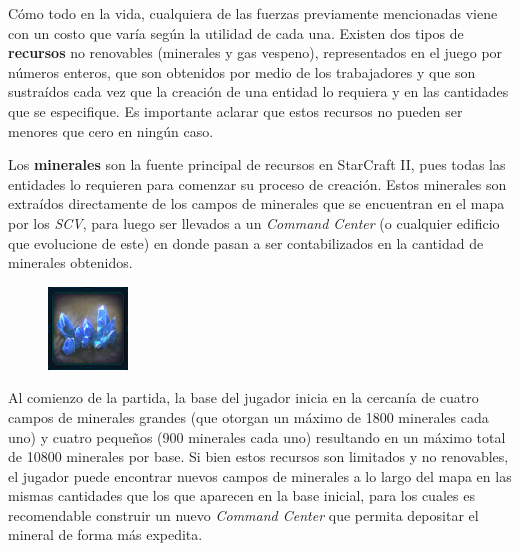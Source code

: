 Cómo todo en la vida, cualquiera de las fuerzas previamente mencionadas viene con un costo que varía según la utilidad de cada una. Existen dos tipos de \textbf{recursos} no renovables (minerales y gas vespeno), representados en el juego por números enteros, que son obtenidos por medio de los trabajadores y que son sustraídos cada vez que la creación de una entidad lo requiera y en las cantidades que se especifique. Es importante aclarar que estos recursos no pueden ser menores que cero en ningún caso.

Los \textbf{minerales} son la fuente principal de recursos en StarCraft II, pues todas las entidades lo requieren para comenzar su proceso de creación. Estos minerales son extraídos directamente de los campos de minerales que se encuentran en el mapa por los \textit{SCV}, para luego ser llevados a un \textit{Command Center} (o cualquier edificio que evolucione de este) en donde pasan a ser contabilizados en la cantidad de minerales obtenidos.

\begin{figure}[H]
	\centering
	\captionsetup{justification=centering}
	\includegraphics[keepaspectratio]{images/minerals.png}
	\label{fig:3}
\end{figure}

Al comienzo de la partida, la base del jugador inicia en la cercanía de cuatro campos de minerales grandes (que otorgan un máximo de 1800 minerales cada uno) y cuatro pequeños (900 minerales cada uno) resultando en un máximo total de 10800 minerales por base. Si bien estos recursos son limitados y no renovables, el jugador puede encontrar nuevos campos de minerales a lo largo del mapa en las mismas cantidades que los que aparecen en la base inicial, para los cuales es recomendable construir un nuevo \textit{Command Center} que permita depositar el mineral de forma más expedita.

